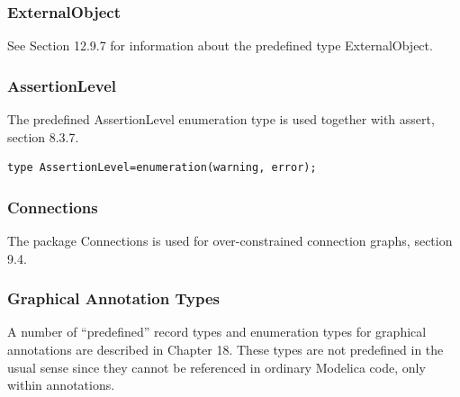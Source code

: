 \documentclass[10pt,a4paper]{report}
\def\doublelabel#1{\label{#1}\hypertarget{#1}{}}
\begin{document}
\subsubsection{ExternalObject}\doublelabel{externalobject}

See Section 12.9.7 for information about the predefined type
ExternalObject.

\subsubsection{AssertionLevel}\doublelabel{assertionlevel}

The predefined AssertionLevel enumeration type is used together with
assert, section 8.3.7.
\begin{lstlisting}[language=modelica]
type AssertionLevel=enumeration(warning, error);
\end{lstlisting}
\subsubsection{Connections}
The package Connections is used for over-constrained connection graphs, section 9.4.

\subsubsection{Graphical Annotation Types}\doublelabel{graphical-annotation-types}

A number of ``predefined'' record types and enumeration types for
graphical annotations are described in Chapter 18. These types are not
predefined in the usual sense since they cannot be referenced in
ordinary Modelica code, only within annotations.
\end{document}
